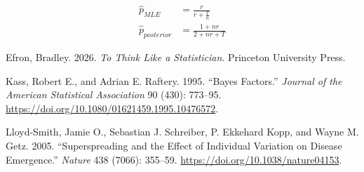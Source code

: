 \documentclass[
  letterpaper,
  DIV=11,
  numbers=noendperiod]{scrreprt}
\newlength{\cslhangindent}
\newenvironment{CSLReferences}[2] %
 {\begin{list}{}{%
  \setlength{\itemindent}{0pt}
  \setlength{\leftmargin}{0pt}
  \setlength{\parsep}{0pt}
  \ifodd #1
   \setlength{\leftmargin}{\cslhangindent}
   \setlength{\itemindent}{-1\cslhangindent}
  \fi
  \setlength{\itemsep}{#2\baselineskip}}}
 {\end{list}}
\begin{document}
\[
\begin{aligned}
\hat{p}_{MLE} &= \frac{r}{r + \frac{T}{n}} \\
\hat{p}_{posterior} &= \frac{1 + nr}{2 + nr + T}
\end{aligned}
\]

\protect{}\label{refs}
\begin{CSLReferences}{1}{1}
Efron, Bradley. 2026. \emph{To Think Like a Statistician}. Princeton
University Press.

Kass, Robert E., and Adrian E. Raftery. 1995. {``Bayes Factors.''}
\emph{Journal of the American Statistical Association} 90 (430):
773--95. \url{https://doi.org/10.1080/01621459.1995.10476572}.

Lloyd-Smith, Jamie O., Sebastian J. Schreiber, P. Ekkehard Kopp, and
Wayne M. Getz. 2005. {``Superspreading and the Effect of Individual
Variation on Disease Emergence.''} \emph{Nature} 438 (7066): 355--59.
\url{https://doi.org/10.1038/nature04153}.

\end{CSLReferences}
\end{document}
